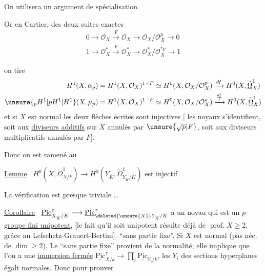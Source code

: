 
On utilisera un argument de spécialisation.

Or en   Cartier, des deux suites exactes
\[
\begin{aligned}
0\to\mathcal O_X\xrightarrow{F}\mathcal O_X\to\mathcal O_X/\mathcal O_X^p\to0\\
1\to\mathcal O_X^*\xrightarrow{F}\mathcal O_X^*\to\mathcal O_X^*/\mathcal O_X^{*p}\to1
\end{aligned}
\]

 on tire
\[
\begin{aligned}
H^1(X,\alpha_p)&=H^1(X,\mathcal O_X)^{1-F}\simeq H^0(X,\mathcal O_X/\mathcal O_X^p)\xrightarrow{df}H^0(X,\widetilde{\underline{\Omega}}^1_X)\\
\unsure{{}_pH^1|pH^1|H^1}(X,\mu_p)&=H^1(X,\mathcal O_X)^{1-F}\simeq H^0(X,\mathcal O_X/\mathcal O_X^*)\xrightarrow{\frac{df}{f}}H^0(X,\widetilde{\underline{\Omega}}^1_X)
\end{aligned}
\]
et si $X$ est \uline{normal} les deux flèches écrites sont injectives [  les noyaux s'identifient, soit aux \uline{diviseurs additifs} sur $X$ annulés par $\unsure{\sqrt{p}|F}$, soit aux diviseurs multiplicatifs annulés par $F$].

Donc on est ramené au

\uline{Lemme} \ $H^0(X,\widetilde\Omega^1_{X/k})\longrightarrow H^0(Y_{\overline K},\widetilde\Omega^1_{Y_{\overline K}/\overline K})$ est injectif

La vérification est presque triviale \ldots

\uline{Corollaire} \ $\underline{\mathrm{Pic}}^\tau_{X_{\overline K}/\overline K}\longrightarrow\underline{\mathrm{Pic}}^\tau_{\deleted{\unsure{X}}Y_{\overline K}/\overline K}$ a un noyau qui est un $p$-\uline{groupe fini unipotent},
[le fait qu'il soit unipotent résulte déjà de $\operatorname{prof.}X\geq2$, grâce au  Lefschetz-Grauert-Bertini]. ``sans partie fixe''. Si $X$ est normal (pas néc. de $\dim\geq2$),  Le ``sans partie fixe'' provient de la normalité; elle implique que l'on a une \uline{immersion fermée} $\underline{\mathrm{Pic}}^\tau_{X/k}\longrightarrow\prod_i\underline{\mathrm{Pic}}_{Y_i/k}$, les $Y_i$ des sections hyperplanes égalt normales. Donc pour prouver

